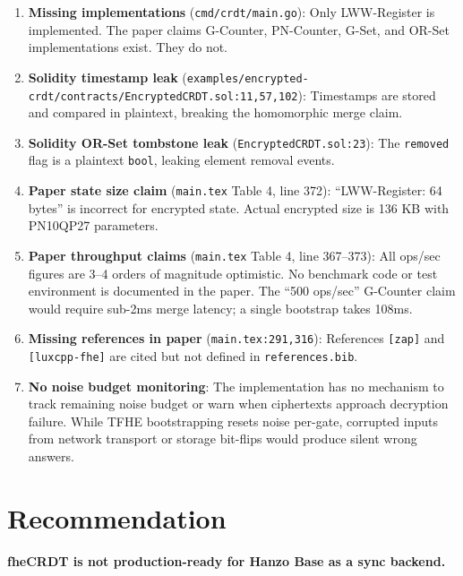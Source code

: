 \documentclass{../shared/luxfhe}
\begin{document}
\begin{enumerate}
\item \textbf{Missing implementations} (\texttt{cmd/crdt/main.go}):
      Only LWW-Register is implemented.  The paper claims G-Counter,
      PN-Counter, G-Set, and OR-Set implementations exist.  They do not.

\item \textbf{Solidity timestamp leak}
      (\texttt{examples/encrypted-crdt/contracts/EncryptedCRDT.sol:11,57,102}):
      Timestamps are stored and compared in plaintext, breaking the
      homomorphic merge claim.

\item \textbf{Solidity OR-Set tombstone leak}
      (\texttt{EncryptedCRDT.sol:23}):
      The \texttt{removed} flag is a plaintext \texttt{bool}, leaking
      element removal events.

\item \textbf{Paper state size claim} (\texttt{main.tex} Table 4, line 372):
      ``LWW-Register: 64 bytes'' is incorrect for encrypted state.
      Actual encrypted size is 136 KB with PN10QP27 parameters.

\item \textbf{Paper throughput claims} (\texttt{main.tex} Table 4, line 367--373):
      All ops/sec figures are 3--4 orders of magnitude optimistic.
      No benchmark code or test environment is documented in the paper.
      The ``500 ops/sec'' G-Counter claim would require sub-2ms merge
      latency; a single bootstrap takes 108ms.

\item \textbf{Missing references in paper} (\texttt{main.tex:291,316}):
      References \texttt{[zap]} and \texttt{[luxcpp-fhe]} are cited but
      not defined in \texttt{references.bib}.

\item \textbf{No noise budget monitoring}: The implementation has no
      mechanism to track remaining noise budget or warn when ciphertexts
      approach decryption failure.  While TFHE bootstrapping resets noise
      per-gate, corrupted inputs from network transport or storage bit-flips
      would produce silent wrong answers.
\end{enumerate}

\section{Recommendation}

\textbf{fheCRDT is not production-ready for Hanzo Base as a sync backend.}
\end{document}
